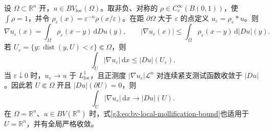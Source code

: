 \begin{lemma}\label{g3:lem:bv-local-mollification}
	设 \(\Omega\subset\mathbb R^n\) 开，\(u\in BV_{\mathrm{loc}}(\Omega)\)。取非负、对称的 \(\rho\in C_c^\infty(B(0,1))\)，使 \(\int\rho=1\)，并令 \(\rho_\varepsilon(x)=\varepsilon^{-n}\rho(x/\varepsilon)\)。在距 \(\partial\Omega\) 大于 \(\varepsilon\) 的点定义 \(u_\varepsilon=\rho_\varepsilon*u\)。则
	\begin{equation}\label{g3:eq:bv-mollified-derivative}
		\nabla u_\varepsilon(x)=\int_\Omega\rho_\varepsilon(x-y)\,\mathrm dDu(y),
		\qquad
		|\nabla u_\varepsilon(x)|
		\le\int_\Omega\rho_\varepsilon(x-y)\,\mathrm d|Du|(y).
	\end{equation}
	若 \(U_\varepsilon=\{y:\operatorname{dist}(y,U)<\varepsilon\}\Subset\Omega\)，则
	\begin{equation}\label{g3:eq:bv-local-mollification-bound}
		\int_U|\nabla u_\varepsilon|\,\mathrm dx
		\le |Du|(U_\varepsilon).
	\end{equation}
	当 \(\varepsilon\downarrow0\) 时，\(u_\varepsilon\to u\) 于 \(L^1_{\mathrm{loc}}\)，且正测度
	\(|\nabla u_\varepsilon|\mathcal L^n\) 对连续紧支测试函数收敛于 \(|Du|\)。因此若 \(U\Subset\Omega\) 开且 \(|Du|(\partial U)=0\)，则
	\[
		\int_U|\nabla u_\varepsilon|\,\mathrm dx\longrightarrow |Du|(U).
	\]
	在 \(\Omega=\mathbb R^n\)、\(u\in BV(\mathbb R^n)\) 时，式\eqref{g3:eq:bv-local-mollification-bound}也适用于 \(U=\mathbb R^n\)，并有全局严格收敛。
\end{lemma}
